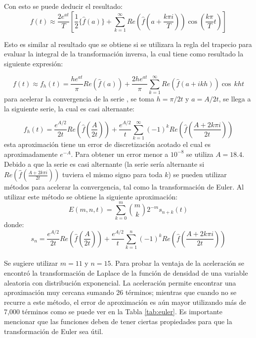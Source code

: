 \documentclass[11pt]{article}
\numberwithin{equation}{section} %
\begin{document}
Con esto se puede deducir el resultado:
\begin{equation}
f(t) \approx \frac{2e^{at}}{T}\left[\frac{1}{2} \{\hat{f}(a) \}+\sum_{k=1}^{\infty}Re\left(\hat{f}\left(a+\frac{k\pi i}{T}\right)\right)\cos\left(\frac{k\pi}{T}t\right)\right]
\end{equation}

Esto es similar al resultado que se obtiene si se utilizara la regla del trapecio para evaluar la integral de la transformación inversa, la cual tiene como resultado la siguiente expresión:

\[
f(t)\approx f_h(t)=\frac{he^{at}}{\pi} Re(\hat{f}(a))+\frac{2he^{at}}{\pi}\sum_{k=1}^{\infty}Re(\hat{f}(a+ikh))\cos\,kht
\]
para acelerar la convergencia de la serie \cite{abate1995}, se toma $h=\pi/2t$ y $a=A/2t$, se llega a la siguiente serie, la cual es casi alternante:

\[
f_h(t)=\frac{e^{A/2}}{2t} Re\left(\hat{f}\left(\frac{A}{2t}\right)\right)+\frac{e^{A/2}}{t}\sum_{k=1}^{\infty}(-1)^k Re\left(\hat{f}\left(\frac{A+2k\pi i}{2t}\right)\right)
\]
esta aproximación tiene un error de discretización acotado \cite{abate1995} el cual es aproximadamente $e^{-A}$. Para obtener un error menor a $10^{-8}$ se utiliza $A=18.4$.\\

Debido a que la serie es casi alternante (la serie sería alternante si $Re\left(\hat{f}\left(\frac{A+2k\pi i}{2t}\right)\right)
$ tuviera el mismo signo para toda $k$) se pueden utilizar métodos para acelerar la convergencia, tal como la transformación de Euler. Al utilizar este método se obtiene la siguiente aproximación:
\[
E(m,n,t)=\sum_{k=0}^m \binom mk 2^{-m}s_{n+k}(t)
\]
donde:
\[
s_n=\frac{e^{A/2}}{2t} Re\left(\hat{f}\left(\frac{A}{2t}\right)\right)+\frac{e^{A/2}}{t}\sum_{k=1}^{n}(-1)^k Re\left(\hat{f}\left(\frac{A+2k\pi i}{2t}\right)\right)
\]
\\

Se sugiere utilizar $m=11$ y $n=15$. Para probar la ventaja de la aceleración se encontró la transformación de Laplace de la función de densidad de una variable aleatoria con distribución exponencial. La aceleración permite encontrar una aproximación muy cercana sumando 26 términos; mientras que cuando no se recurre a este método, el error de aproximación es aún mayor utilizando más de 7,000 términos como se puede ver en la Tabla \ref{tab:euler}. Es importante mencionar que las funciones deben de tener ciertas propiedades para que la transformación de Euler sea útil.\\
\end{document}

